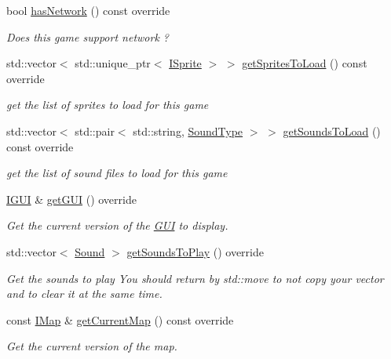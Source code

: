 \begin{DoxyCompactItemize}
bool \hyperlink{classarcade_1_1_snake_game_aa93dbf6b52cb70629abbf646ed33374f}{has\+Network} () const override
\begin{DoxyCompactList}\small\item\em Does this game support network ? \end{DoxyCompactList}\item 
std\+::vector$<$ std\+::unique\+\_\+ptr$<$ \hyperlink{classarcade_1_1_i_sprite}{I\+Sprite} $>$ $>$ \hyperlink{classarcade_1_1_snake_game_aac167f01d2da5121b2f34dd3ca258a45}{get\+Sprites\+To\+Load} () const override
\begin{DoxyCompactList}\small\item\em get the list of sprites to load for this game \end{DoxyCompactList}\item 
std\+::vector$<$ std\+::pair$<$ std\+::string, \hyperlink{namespacearcade_a3bb4743a2eea59f3927e404e6549cae5}{Sound\+Type} $>$ $>$ \hyperlink{classarcade_1_1_snake_game_a2d8ca7114ab012187da99658a221fab9}{get\+Sounds\+To\+Load} () const override
\begin{DoxyCompactList}\small\item\em get the list of sound files to load for this game \end{DoxyCompactList}\item 
\hyperlink{classarcade_1_1_i_g_u_i}{I\+G\+UI} \& \hyperlink{classarcade_1_1_snake_game_ab586312d56bab5be7e1506fa513fea44}{get\+G\+UI} () override
\begin{DoxyCompactList}\small\item\em Get the current version of the \hyperlink{classarcade_1_1_g_u_i}{G\+UI} to display. \end{DoxyCompactList}\item 
std\+::vector$<$ \hyperlink{structarcade_1_1_sound}{Sound} $>$ \hyperlink{classarcade_1_1_snake_game_aab993e72ca1b68914c37209781a68835}{get\+Sounds\+To\+Play} () override
\begin{DoxyCompactList}\small\item\em Get the sounds to play You should return by std\+::move to not copy your vector and to clear it at the same time. \end{DoxyCompactList}\item 
const \hyperlink{classarcade_1_1_i_map}{I\+Map} \& \hyperlink{classarcade_1_1_snake_game_abc3fe4beaa1d2b7df8573f3375cbd4cb}{get\+Current\+Map} () const override
\begin{DoxyCompactList}\small\item\em Get the current version of the map. \end{DoxyCompactList}\item 

\end{DoxyCompactItemize}
